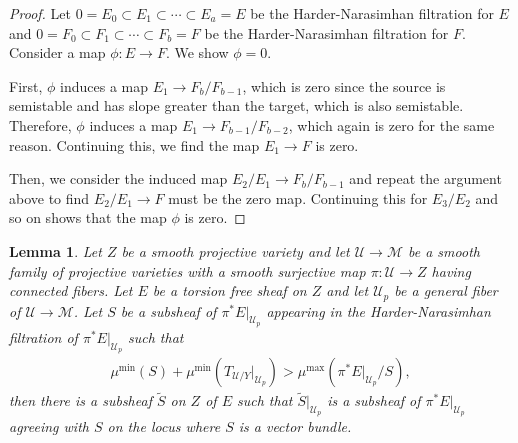 \documentclass[11pt,reqno]{amsart}
\theoremstyle{plain}
\newtheorem{lemma}[theorem]{Lemma}
\theoremstyle{definition}
\theoremstyle{remark}
\numberwithin{equation}{section}
\renewcommand{\to}{{\longrightarrow}}
\numberwithin{equation}{section}
\newcommand{\cM}{\mathcal{M}}
\newcommand{\cU}{\mathcal{U}}
\begin{document}
\begin{proof}
Let $0=E_0\subset E_1\subset \cdots\subset E_a=E$ be the Harder-Narasimhan filtration for $E$ and $0=F_0\subset F_1\subset \cdots\subset F_b=F$ be the Harder-Narasimhan filtration for $F$. Consider a map $\phi: E\to F$. We show $\phi=0$.

First, $\phi$ induces a map $E_1\to F_b/F_{b-1}$, which is zero since the source is semistable and has slope greater than the target, which is also semistable. Therefore, $\phi$ induces a map $E_1\to F_{b-1}/F_{b-2}$, which again is zero for the same reason. Continuing this, we find the map $E_1\to F$ is zero.

Then, we consider the induced map $E_2/E_1\to F_{b}/F_{b-1}$ and repeat the argument above to find $E_2/E_1\to F$ must be the zero map. Continuing this for $E_3/E_2$ and so on shows that the map $\phi$ is zero.
\end{proof}

\begin{lemma}
\label{integrate}
Let $Z$ be a smooth projective variety and let $\cU \to \cM$ be a smooth family of projective varieties with a smooth surjective map $\pi:\cU \to Z$ having connected fibers. Let $E$ be a torsion free sheaf on $Z$ and let $\cU_p$ be a general fiber of $\cU\to \cM$. Let $S$ be a subsheaf of $\pi^{*}E|_{\cU_p}$ appearing in the Harder-Narasimhan filtration of $\pi^{*}E|_{\cU_p}$ such that
\begin{align*}
    \mu^{\min}(S)+\mu^{\min}(T_{\cU/Y}|_{\cU_p})>\mu^{\max}(\pi^{*}E|_{\cU_p}/S),
\end{align*}
then there is a subsheaf $\widetilde{S}$ on $Z$ of $E$ such that $\widetilde{S}|_{\cU_p}$ is a subsheaf of $\pi^{*}E|_{\cU_p}$ agreeing with $S$ on the locus where $S$ is a vector bundle.
\end{lemma}
\end{document}
